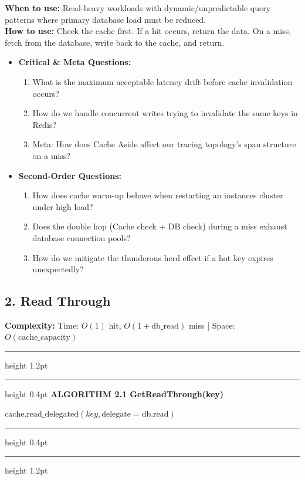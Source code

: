 \documentclass[11pt,a4paper]{article}
\newenvironment{textbookalgo}[2]{%
  \par\addvspace{1.2em}\noindent
  \hrule height 1.2pt
  \vspace{1.5pt}
  \hrule height 0.4pt
  \vspace{5pt}
  {\noindent\large\bfseries\sffamily ALGORITHM #1 \quad #2}
  \par\vspace{5pt}
  \RestyleAlgo{plain}
}{%
  \par\vspace{4pt}
  \hrule height 0.4pt
  \vspace{1.5pt}
  \hrule height 1.2pt
  \par\addvspace{1.2em}
}
\theoremstyle{definition}
\begin{document}
\noindent
\textbf{When to use:} Read-heavy workloads with dynamic/unpredictable query patterns where primary database load must be reduced.\\
\textbf{How to use:} Check the cache first. If a hit occurs, return the data. On a miss, fetch from the database, write back to the cache, and return.
\begin{itemize}[leftmargin=*]
  \item[] \textbf{Critical \& Meta Questions:}
  \begin{enumerate}
  \item What is the maximum acceptable latency drift before cache invalidation occurs?
  \item How do we handle concurrent writes trying to invalidate the same keys in Redis?
  \item Meta: How does Cache Aside affect our tracing topology's span structure on a miss?
  \end{enumerate}
  \item[] \textbf{Second-Order Questions:}
  \begin{enumerate}
  \item How does cache warm-up behave when restarting an instances cluster under high load?
  \item Does the double hop (Cache check + DB check) during a miss exhaust database connection pools?
  \item How do we mitigate the thunderous herd effect if a hot key expires unexpectedly?
  \end{enumerate}
\end{itemize}
\medskip

\clearpage
\subsection{2. Read Through}

\noindent
\textbf{Complexity:} Time: $O(1)$ hit, $O(1 + \text{db\_read})$ miss | Space: $O(\text{cache\_capacity})$
\smallskip

\begin{textbookalgo}{2.1}{GetReadThrough(key)}
\begin{algorithm}[H]
\Return $\text{cache.read\_delegated}(key, \text{delegate}=\text{db.read})$\;
\end{algorithm}
\end{textbookalgo}
\end{document}
